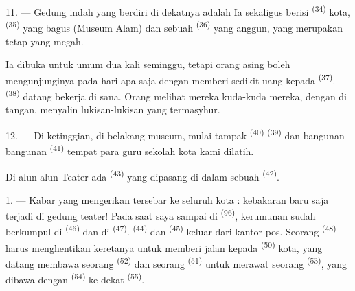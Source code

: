 \VUsaut{4.0mm}
\VUsaut{3.4mm}

11. --- Gedung indah yang berdiri di dekatnya adalah 
Ia sekaligus berisi  \textsuperscript{(34)} kota,
 \textsuperscript{(35)} yang bagus (Museum
Alam) dan sebuah  \textsuperscript{(36)} yang
anggun, yang merupakan  tetap yang megah.

Ia dibuka untuk umum dua kali seminggu, tetapi orang asing boleh
mengunjunginya pada hari apa saja dengan memberi sedikit uang kepada
 \textsuperscript{(37)}. 
\textsuperscript{(38)} datang bekerja di sana. Orang melihat mereka
 kuda-kuda mereka, dengan  di tangan,
menyalin lukisan-lukisan yang termasyhur.

12. --- Di ketinggian, di belakang museum, mulai tampak 
\textsuperscript{(40)}  \textsuperscript{(39)} dan
bangunan-bangunan  \textsuperscript{(41)} tempat
para guru sekolah kota kami dilatih.

Di alun-alun Teater ada  \textsuperscript{(43)} yang
dipasang di dalam sebuah 
\textsuperscript{(42)}.

\VUsaut{5.0mm}
\VUsaut{3.0mm}

\VUsaut{3.4mm}

1. --- Kabar yang mengerikan tersebar ke seluruh kota : kebakaran baru
saja terjadi di gedung teater! Pada saat saya sampai di
 \textsuperscript{(96)}, kerumunan sudah berkumpul di
 \textsuperscript{(46)} dan di 
\textsuperscript{(47)}.  \textsuperscript{(44)}
dan  \textsuperscript{(45)} keluar dari
kantor pos. Seorang  \textsuperscript{(48)} harus
menghentikan keretanya untuk memberi jalan kepada  \textsuperscript{(50)} kota, yang datang membawa seorang
 \textsuperscript{(52)} dan seorang 
\textsuperscript{(51)} untuk merawat seorang 
\textsuperscript{(53)}, yang dibawa dengan 
\textsuperscript{(54)} ke dekat 
\textsuperscript{(55)}.

